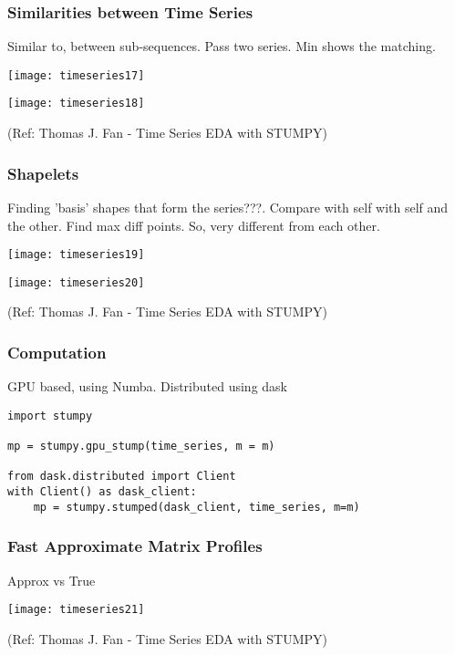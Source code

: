 \begin{frame}[fragile]\frametitle{Similarities between Time Series}

Similar to, between sub-sequences. Pass two series. Min shows the matching.


\begin{center}
\texttt{[image: timeseries17]}

\texttt{[image: timeseries18]}


{\tiny (Ref: Thomas J. Fan - Time Series EDA with STUMPY)}		
\end{center}

\end{frame}

\begin{frame}[fragile]\frametitle{Shapelets}

Finding 'basis' shapes that form the series???. Compare with self with self and the other. Find max diff points. So, very different from each other.

\begin{center}
\texttt{[image: timeseries19]}

\texttt{[image: timeseries20]}


{\tiny (Ref: Thomas J. Fan - Time Series EDA with STUMPY)}		
\end{center}

\end{frame}

\begin{frame}[fragile]\frametitle{Computation}

GPU based, using Numba. Distributed using dask

\begin{lstlisting}
import stumpy

mp = stumpy.gpu_stump(time_series, m = m)

from dask.distributed import Client
with Client() as dask_client:
	mp = stumpy.stumped(dask_client, time_series, m=m)
\end{lstlisting}

\end{frame}

\begin{frame}[fragile]\frametitle{Fast Approximate Matrix Profiles}

Approx vs True

\begin{center}
\texttt{[image: timeseries21]}


{\tiny (Ref: Thomas J. Fan - Time Series EDA with STUMPY)}		
\end{center}

\end{frame}


